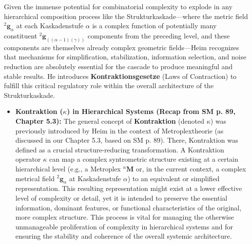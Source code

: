 \documentclass[12pt]{article}
\newcommand{\metroplex}[1]{{}^{#1}\mathbf{M}}
\newcommand{\kompositionsfeld}{{}^2\mathbf{g}}
\newcommand{\partialstruktur}[1]{{}^2\mathbf{g}_{(#1)}} %
\newcommand{\kaskadenstufe}{\alpha}
\begin{document}
Given the immense potential for combinatorial complexity to explode in any hierarchical composition process like the Strukturkaskade—where the metric field \( \kompositionsfeld_\alpha \) at each Kaskadenstufe \( \kaskadenstufe \) is a complex function of potentially many constituent \( \partialstruktur{(\alpha-1)(\gamma)} \) components from the preceding level, and these components are themselves already complex geometric fields—Heim recognizes that mechanisms for simplification, stabilization, information selection, and noise reduction are absolutely essential for the cascade to produce meaningful and stable results. He introduces \textbf{Kontraktionsgesetze} (Laws of Contraction) to fulfill this critical regulatory role within the overall architecture of the Strukturkaskade.

\begin{itemize}
    \item \textbf{Kontraktion (\( \kappa \)) in Hierarchical Systems (Recap from SM p. 89, Chapter 5.3):}
    The general concept of \textbf{Kontraktion} (denoted \( \kappa \)) was previously introduced by Heim in the context of Metroplextheorie (as discussed in our Chapter 5.3, based on SM p. 89). There, Kontraktion was defined as a crucial structure-reducing transformation. A Kontraktion operator \( \kappa \) can map a complex syntrometric structure existing at a certain hierarchical level (e.g., a Metroplex \( \metroplex{n} \) or, in the current context, a complex metrical field \( \kompositionsfeld_\alpha \) at Kaskadenstufe \( \kaskadenstufe \)) to an equivalent or simplified representation. This resulting representation might exist at a lower effective level of complexity or detail, yet it is intended to preserve the essential information, dominant features, or functional characteristics of the original, more complex structure. This process is vital for managing the otherwise unmanageable proliferation of complexity in hierarchical systems and for ensuring the stability and coherence of the overall systemic architecture.


\end{itemize}
\end{document}
